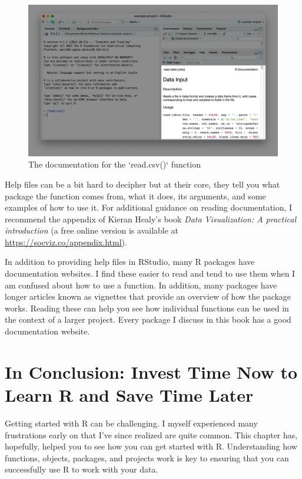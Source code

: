 \documentclass[
]{book}
\begin{document}
\begin{figure}
\includegraphics[width=1\linewidth]{assets/readcsv-documentation} \caption{The documentation for the `read.csv()` function}\label{fig:readcsv-documentation}
\end{figure}

Help files can be a bit hard to decipher but at their core, they tell you what package the function comes from, what it does, its arguments, and some examples of how to use it. For additional guidance on reading documentation, I recommend the appendix of Kieran Healy's book \emph{Data Visualization: A practical introduction} (a free online version is available at \url{https://socviz.co/appendix.html}).

In addition to providing help files in RStudio, many R packages have documentation websites. I find these easier to read and tend to use them when I am confused about how to use a function. In addition, many packages have longer articles known as vignettes that provide an overview of how the package works. Reading these can help you see how individual functions can be used in the context of a larger project. Every package I discuss in this book has a good documentation website.

\hypertarget{in-conclusion-invest-time-now-to-learn-r-and-save-time-later}{%
\section*{In Conclusion: Invest Time Now to Learn R and Save Time Later}\label{in-conclusion-invest-time-now-to-learn-r-and-save-time-later}}

Getting started with R can be challenging. I myself experienced many frustrations early on that I've since realized are quite common. This chapter has, hopefully, helped you to see how you can get started with R. Understanding how functions, objects, packages, and projects work is key to ensuring that you can successfully use R to work with your data.
\end{document}

